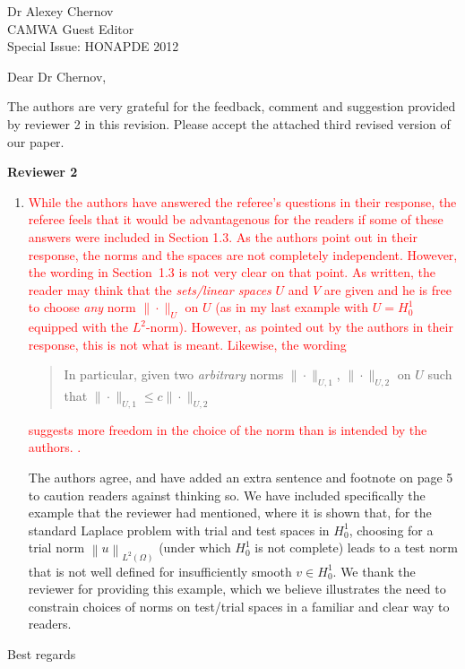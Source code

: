 \documentclass{letter}
\newcommand{\nor}[1]{\left\| #1 \right\|}
\newcommand{\LRp}[1]{\left( #1 \right)}
\renewcommand{\L}{L^2\LRp{\Omega}}
\begin{document}
\begin{letter}{Dr Alexey Chernov\\CAMWA Guest Editor\\Special Issue: HONAPDE 2012}


\opening{Dear Dr Chernov,}

The authors are very grateful for the feedback, comment and suggestion provided by reviewer 2 in this revision.  Please accept the attached third revised version of our paper. 

\textbf{Reviewer 2}

\begin{enumerate}
\item \textcolor{red}{
While the authors have answered the referee's questions in their response, the referee feels that it would be advantagenous for the readers if some of these answers were included in Section 1.3. As the authors point out in their response, the norms and the spaces are not completely independent. However, the wording in Section~{1.3} is not very clear on that point. As written, the reader may think that the {\em sets/linear spaces} $U$ and $V$ are given and he is free to choose {\em any} norm $\|\cdot\|_U$ on $U$ (as in my last example with $U = H^1_0$ equipped with the $L^2$-norm). However, as pointed out by the authors in their response, this is not what is meant. Likewise, the wording
\begin{quote}
In particular, given two {\em arbitrary} norms $\|\cdot\|_{U,1}$,
$\|\cdot\|_{U,2}$ on $U$ such that $\|\cdot\|_{U,1} \leq c \|\cdot\|_{U,2}$
\end{quote}
suggests more freedom in the choice of the norm than is intended by the authors.
.}  The authors agree, and have added an extra sentence and footnote on page 5 to caution readers against thinking so.  We have included specifically the example that the reviewer had mentioned, where it is shown that, for the standard Laplace problem with trial and test spaces in $H^1_0$, choosing for a trial norm $\nor{u}_{\L}$ (under which $H^1_0$ is not complete) leads to a test norm that is not well defined for insufficiently smooth $v\in H^1_0$.  We thank the reviewer for providing this example, which we believe illustrates the need to constrain choices of norms on test/trial spaces in a familiar and clear way to readers.  
\end{enumerate}
\closing{Best regards}




\end{letter}
\end{document}

